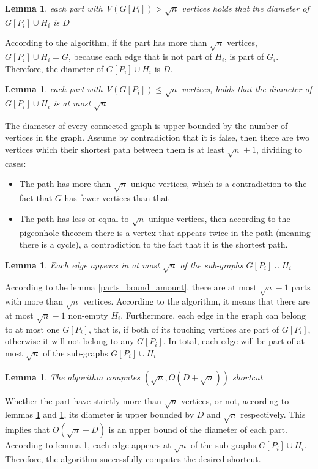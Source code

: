 \documentclass[11pt]{article}
\newtheorem{lemma}[theorem]{Lemma}
\begin{document}
\begin{lemma}
\label{parts_dimater_D}
each part with {\Large V}$(G[P_i]) > \sqrt{n}$ vertices holds that the diameter of $G[P_i] \cup H_i$ is $D$
\end{lemma}
According to the algorithm, if the part has more than $\sqrt{n}$ vertices, $G[P_i] \cup H_i = G$, because each edge that is not part of $H_i$, is part of $G_i$. Therefore, the diameter of $G[P_i] \cup H_i$ is $D$.

\begin{lemma}
\label{parts_dimater_sqrt_n}
each part with {\Large V}$(G[P_i]) \le \sqrt{n}$ vertices, holds that the diameter of $G[P_i] \cup H_i$ is at most $\sqrt{n}$
\end{lemma}
The diameter of every connected graph is upper bounded by the number of vertices in the graph. Assume by contradiction that it is false, then there are two vertices which their shortest path between them is at least $\sqrt{n} +1$, dividing to cases:
\begin{itemize}
    \item The path has more than $\sqrt{n}$ unique vertices, which is a contradiction to the fact that $G$ has fewer vertices than that
    \item The path has less or equal to $\sqrt{n}$ unique vertices, then according to the pigeonhole theorem there is a vertex that appears twice in the path (meaning there is a cycle), a contradiction to the fact that it is the shortest path. 
\end{itemize}


\begin{lemma}
\label{edges_bound}
Each edge appears in at most $\sqrt{n}$ of the sub-graphs $G[P_i] \cup H_i$
\end{lemma}
According to the lemma \ref{parts_bound_amount}, there are at most $\sqrt{n} -1$ parts with more than $\sqrt{n}$ vertices. According to the algorithm, it means that there are at most $\sqrt{n}-1$ non-empty $H_i$. Furthermore, each edge in the graph can belong to at most one $G[P_i]$, that is, if both of its touching vertices are part of $G[P_i]$, otherwise it will not belong to any $G[P_i]$.
In total, each edge will be part of at most $\sqrt{n}$ of the sub-graphs $G[P_i] \cup H_i$

\begin{lemma} The algorithm computes $(\sqrt{n}, O(D + \sqrt{n}) )$ shortcut
\end{lemma}
Whether the part have strictly more than $\sqrt{n}$ vertices, or not, according to lemmas \ref{parts_dimater_D} and \ref{parts_dimater_sqrt_n}, its diameter is upper bounded by $D$ and $\sqrt{n}$ respectively. This implies that $O(\sqrt{n} +D)$ is an upper bound of the diameter of each part. According to lemma \ref{edges_bound}, each edge appears at $\sqrt{n}$ of the sub-graphs $G[P_i] \cup H_i$. Therefore, the algorithm successfully computes the desired shortcut.
\end{document}
